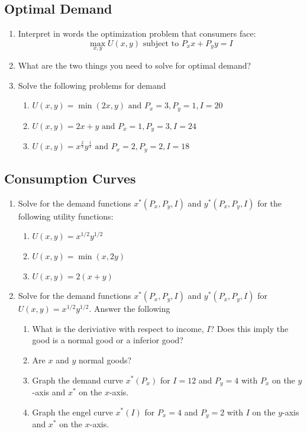 \documentclass[11pt]{article}
\begin{document}
\subsection*{Optimal Demand}
\begin{enumerate}
  \item Interpret in words the optimization problem that consumers face:
  $$
    \max_{x,y} U(x,y) \text{ subject to } P_x x + P_y y = I
  $$

  \item What are the two things you need to solve for optimal demand?

  \item Solve the following problems for demand

  \begin{enumerate}
    \item $U(x,y) = \min(2x, y) \text{ and } P_x = 3, P_y = 1, I = 20$
    
    \item $U(x,y) = 2x + y \text{ and } P_x = 1, P_y = 3, I = 24$
    
    \item $U(x,y) = x^{\frac{2}{3}} y^{\frac{1}{3}}  \text{ and } P_x = 2, P_y = 2, I = 18$
  \end{enumerate}
\end{enumerate}

\subsection*{Consumption Curves}
\begin{enumerate}
  \item Solve for the demand functions $x^*(P_x, P_y, I)$ and $y^*(P_x, P_y, I)$ for the following utility functions:
  
  \begin{enumerate}
    \item $U(x,y) = x^{1/2} y^{1/2}$
    \item $U(x,y) = \min(x, 2y)$
    \item $U(x,y) = 2(x + y)$
  \end{enumerate}

  \item Solve for the demand functions $x^*(P_x, P_y, I)$ and $y^*(P_x, P_y, I)$ for $U(x,y) = x^{1/2} y^{1/2}$. Answer the following
  \begin{enumerate}
    \item What is the deriviative with respect to income, $I$? Does this imply the good is a normal good or a inferior good?
    
    \item Are $x$ and $y$ normal goods?
    
    \item Graph the demand curve $x^*(P_x)$ for $I = 12$ and $P_y = 4$ with $P_x$ on the $y$-axis and $x^*$ on the $x$-axis.
    
    \item Graph the engel curve $x^*(I)$ for $P_x = 4$ and $P_y = 2$ with $I$ on the $y$-axis and $x^*$ on the $x$-axis.
  \end{enumerate}
\end{enumerate}
\end{document}
